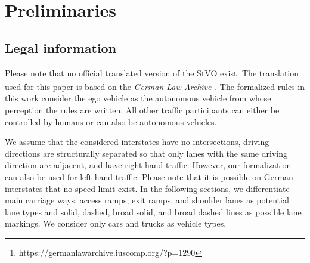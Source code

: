 
\section{Preliminaries}
\label{sec:preliminaries}
\subsection{Legal information}
Please note that no official translated version of the StVO exist. The translation used for this paper is based on the \textit{German Law Archive}\footnote{https://germanlawarchive.iuscomp.org/?p=1290}.
The formalized rules in this work consider the ego vehicle as the autonomous vehicle from whose perception the rules are written. All other traffic participants can either be controlled by humans or can also be autonomous vehicles.

We assume that the considered interstates have no intersections, driving directions are structurally separated so that only lanes with the same driving direction are adjacent, and have right-hand traffic. However, our formalization can also be used for left-hand traffic.
Please note that it is possible on German interstates that no speed limit exist. In the following sections, we differentiate main carriage ways, access ramps, exit ramps, and shoulder lanes as potential lane types and solid, dashed, broad solid, and broad dashed lines as possible lane markings. We consider only cars and trucks as vehicle types. %


